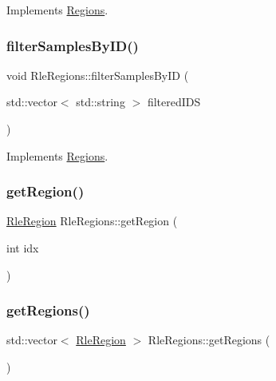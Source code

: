 Implements \hyperlink{struct_regions_a5763d0526981f665356ac35734e8e505}{Regions}.

\mbox{\label{struct_rle_regions_a50e7df1873c11d5436cbe875593c331b}} 
\subsubsection{\texorpdfstring{filter\+Samples\+By\+I\+D()}{filterSamplesByID()}}
{\footnotesize\ttfamily void Rle\+Regions\+::filter\+Samples\+By\+ID (\begin{DoxyParamCaption}\item[{std\+::vector$<$ std\+::string $>$}]{filtered\+I\+DS }\end{DoxyParamCaption})\hspace{0.3cm}{\ttfamily [virtual]}}



Implements \hyperlink{struct_regions_ae2bcea2b1c245a9d1ab1ff3abc23f2a0}{Regions}.

\mbox{\label{struct_rle_regions_a0188b60eb616945a63ad9dd14a167392}} 
\subsubsection{\texorpdfstring{get\+Region()}{getRegion()}}
{\footnotesize\ttfamily \hyperlink{struct_rle_region}{Rle\+Region} Rle\+Regions\+::get\+Region (\begin{DoxyParamCaption}\item[{int}]{idx }\end{DoxyParamCaption})}

\mbox{\label{struct_rle_regions_a66101430c60a2e954c9f9b197bbd4030}} 
\subsubsection{\texorpdfstring{get\+Regions()}{getRegions()}}
{\footnotesize\ttfamily std\+::vector$<$ \hyperlink{struct_rle_region}{Rle\+Region} $>$ Rle\+Regions\+::get\+Regions (\begin{DoxyParamCaption}{ }\end{DoxyParamCaption})}

